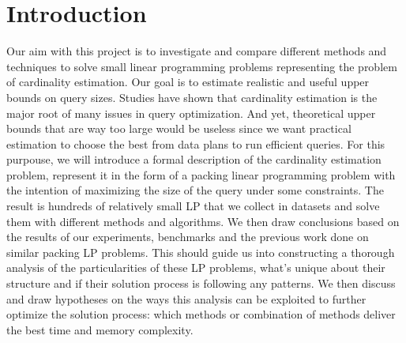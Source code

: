 
\chapter{Introduction}\label{chapter:introduction}

Our aim with this project is to investigate and compare different methods 
and techniques to solve small linear programming problems representing 
the problem of cardinality estimation. Our goal is to 
estimate realistic and useful upper bounds on query sizes. Studies have 
shown that cardinality estimation is the major root of many issues in 
query optimization. \parencite{ngo2022information} And yet, theoretical upper bounds that
are way too large would be useless since we want practical estimation to choose
the best from data plans to run efficient queries.
For this purpouse, we will introduce a formal description of the cardinality
estimation problem, represent it in the form of a packing linear programming problem with
the intention of maximizing the size of the query under some constraints. The result is
hundreds of relatively small LP that we collect in datasets and solve them 
with different methods and algorithms. We then draw conclusions based on the results of
our experiments, benchmarks and the previous work done on similar packing LP problems.
This should guide us into constructing a thorough analysis of the particularities of
these LP problems, what's unique about their structure and if their solution
process is following any patterns. We then discuss and draw hypotheses on the ways this 
analysis can be exploited to further optimize the solution process: which methods or 
combination of methods deliver the best time and memory complexity.
